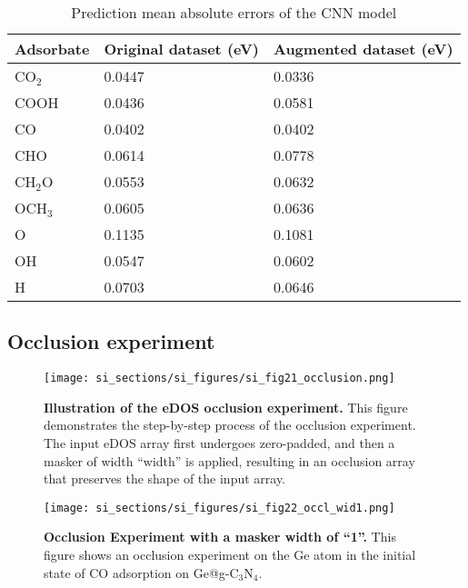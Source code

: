 \begin{table}[h]
  \centering
  \begin{tabular}{lll}
    \hline
    \textbf{Adsorbate} & \textbf{Original dataset (eV)} & \textbf{Augmented dataset (eV)} \\
    \hline
    CO$_2$  & 0.0447 & 0.0336 \\
    COOH    & 0.0436 & 0.0581 \\
    CO      & 0.0402 & 0.0402 \\
    CHO     & 0.0614 & 0.0778 \\
    CH$_2$O & 0.0553 & 0.0632 \\
    OCH$_3$ & 0.0605 & 0.0636 \\
    O       & 0.1135 & 0.1081 \\
    OH      & 0.0547 & 0.0602 \\
    H       & 0.0703 & 0.0646 \\
    \hline
  \end{tabular}
  \caption{Prediction mean absolute errors of the CNN model}
  \label{si_table18}
\end{table}


\subsection{Occlusion experiment}


\begin{figure}
  \centering
  \texttt{[image: si\_sections/si\_figures/si\_fig21\_occlusion.png]}
  \caption{\textbf{Illustration of the eDOS occlusion experiment.}
  This figure demonstrates the step-by-step process of the occlusion experiment.
  The input eDOS array first undergoes zero-padded, and then a masker of width “width” is applied,
  resulting in an occlusion array that preserves the shape of the input array.}
  \label{si_fig21:occlusion}
\end{figure}


\begin{figure}
  \centering
  \texttt{[image: si\_sections/si\_figures/si\_fig22\_occl\_wid1.png]}
  \caption{\textbf{Occlusion Experiment with a masker width of “1”.}
  This figure shows an occlusion experiment on the Ge atom in
  the initial state of CO adsorption on Ge@g-C$_3$N$_4$.}
  \label{si_fig22:occl_wid1}
\end{figure}


